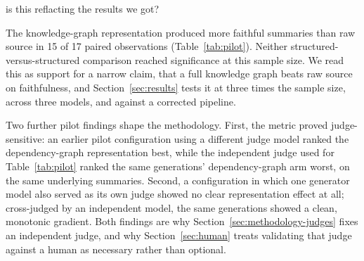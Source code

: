 is this reflacting the results we got?\documentclass[conference]{IEEEtran}
\begin{document}
The knowledge-graph representation produced more faithful summaries than raw source in 15 of 17
paired observations (Table~\ref{tab:pilot}). Neither structured-versus-structured comparison
reached significance at this sample size. We read this as support for a narrow claim, that a
full knowledge graph beats raw source on faithfulness, and Section~\ref{sec:results} tests it at
three times the sample size, across three models, and against a corrected pipeline.

Two further pilot findings shape the methodology. First, the metric proved judge-sensitive: an
earlier pilot configuration using a different judge model ranked the dependency-graph
representation best, while the independent judge used for Table~\ref{tab:pilot} ranked the same
generations' dependency-graph arm worst, on the same underlying summaries. Second, a
configuration in which one generator model also served as its own judge showed no clear
representation effect at all; cross-judged by an independent model, the same generations showed
a clean, monotonic gradient. Both findings are why Section~\ref{sec:methodology-judges} fixes an
independent judge, and why Section~\ref{sec:human} treats validating that judge against a human
as necessary rather than optional.
\end{document}
